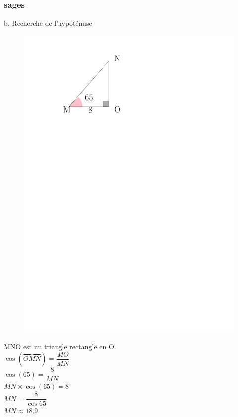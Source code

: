 \documentclass{beamer}
\begin{document}
\begin{frame}
  \frametitle{{}sages}
  
  \begin{exampleblock}{b. Recherche de l'hypoténuse}
    
    \begin{multicols}{2}
      
      \begin{figure}[H]
	      \centering
	      \includegraphics[width=\linewidth]{sources/2/rec-a2.pdf}
	    \end{figure}
      
      MNO est un triangle rectangle en O.\\
      
      $\cos(\overbrace{OMN}) = \dfrac{MO}{MN}$\\  
      $\cos(65) = \dfrac{8}{MN}$\\
      $MN \times \cos(65) = 8$\\
      $MN = \dfrac{8}{\cos{65}}$\\
      $MN \approx 18.9 $
      
    \end{multicols}
  \end{exampleblock}
  
\end{frame}
\end{document}
